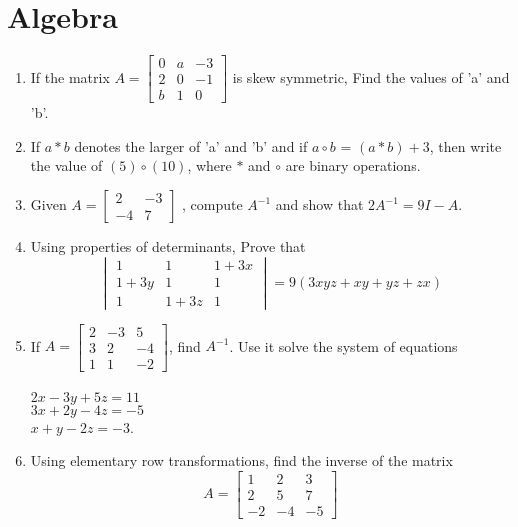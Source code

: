 \documentclass{article}
\newcommand{\mydet}[1]{\ensuremath{\begin{vmatrix}#1\end{vmatrix}}}
\providecommand{\brak}[1]{\ensuremath{\left(#1\right)}}
\begin{document}
\section{Algebra}
\begin{enumerate}
 \item If the matrix $ A=\begin{bmatrix}
		0 & a & -3\\
		2 & 0 & -1\\
		b & 1 & 0
                \end{bmatrix}$ is skew symmetric, Find the values of 'a' and 'b'.
\item If $a \ast b$ denotes the larger of 'a' and 'b' and if $a \circ b$ = $ \brak{a \ast b}+ 3$, then write the value of $ \brak{5} \circ \brak{10} $, where $\ast$ and $\circ$ are binary operations.  
\item Given $ A = \begin{bmatrix}
		2 & -3\\
		-4 & 7
\end{bmatrix}$ , compute $A^{-1}$ and show that $2A^{-1}=9I - A$.
\item Using properties of determinants, Prove that \[ \mydet{
		1 & 1 & 1+3x \\
		1+3y & 1 & 1 \\
		1 & 1+3z & 1}
	=9\brak{3xyz+xy+yz+zx}\]
\item If $A=\begin{bmatrix}
		2 & -3 & 5 \\
		3 & 2 & -4 \\
		1 & 1 & -2
\end{bmatrix}$, find $ A^{-1}$. Use it solve the system of equations\\
\\
$2x-3y+5z=11$\\
$3x+2y-4z=-5$\\
$x+y-2z=-3$.
\item Using elementary row transformations, find the inverse of the matrix 
	\[  A=\begin{bmatrix}
		1 & 2 & 3\\
		2 & 5 & 7\\
		-2 & -4 & -5
	\end{bmatrix}\]
\end{enumerate}
\end{document}
